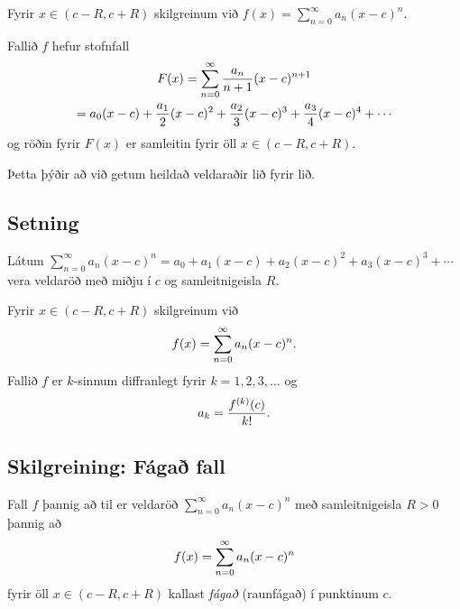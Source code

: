 \documentclass[b5paper,10pt,icelandic]{sphinxmanual}
\begin{document}
Fyrir \(x\in(c-R, c+R)\) skilgreinum við
\(f(x)=\sum_{n=0}^\infty a_n(x-c)^n\).

Fallið \(f\) hefur stofnfall
\begin{gather}
\begin{split}\begin{gathered}
F(x)=\sum_{n=0}^\infty \frac{a_n}{n+1}(x-c)^{n+1} \\
=a_0(x-c)+\frac{a_1}{2}(x-c)^2+\frac{a_2}{3}(x-c)^3+
\frac{a_3}{4}(x-c)^4+\cdots\end{gathered}\end{split}\notag
\end{gather}
og röðin fyrir \(F(x)\) er samleitin fyrir öll
\(x\in(c-R, c+R)\).

Þetta þýðir að við getum heildað veldaraðir lið fyrir lið.


\subsection{Setning}
\label{kafli10:id3}
Látum \(\sum_{n=0}^\infty a_n(x-c)^n=a_0+a_1(x-c)+a_2(x-c)^2+a_3(x-c)^3+\cdots\)
vera veldaröð með miðju í \(c\) og samleitnigeisla \(R\).

Fyrir \(x\in(c-R, c+R)\) skilgreinum við
\begin{gather}
\begin{split}f(x)=\sum_{n=0}^\infty a_n(x-c)^n.\end{split}\notag
\end{gather}
Fallið \(f\) er \(k\)-sinnum diffranlegt fyrir \(k=1, 2, 3, \ldots\) og
\begin{gather}
\begin{split}a_k=\frac{f^{(k)}(c)}{k!}.\end{split}\notag
\end{gather}

\subsection{Skilgreining: Fágað fall}
\label{kafli10:skilgreining-faga-fall}\label{kafli10:index-5}
Fall \(f\) þannig að til er veldaröð
\(\sum_{n=0}^\infty a_n(x-c)^n\) með samleitnigeisla \(R>0\)
þannig að
\begin{gather}
\begin{split}f(x)=\sum_{n=0}^\infty a_n(x-c)^n\end{split}\notag
\end{gather}
fyrir öll \(x\in(c-R, c+R)\) kallast \emph{fágað} (raunfágað) í punktinum
\(c\).
\end{document}
